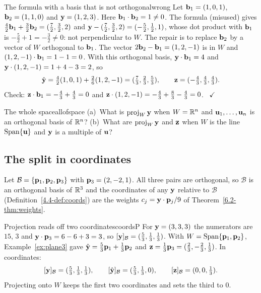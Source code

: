 \documentclass[11pt]{article}
\begin{document}
\begin{exmp}{The formula with a basis that is not orthogonal}{wrong}
Let $\mathbf{b}_1=(1,0,1)$, $\mathbf{b}_2=(1,1,0)$ and $\mathbf{y}=(1,2,3)$. Here $\mathbf{b}_1\cdot\mathbf{b}_2=1\neq0$. The formula (misused) gives $\tfrac42\mathbf{b}_1+\tfrac32\mathbf{b}_2=(\tfrac72,\tfrac32,2)$ and $\mathbf{y}-(\tfrac72,\tfrac32,2)=(-\tfrac52,\tfrac12,1)$, whose dot product with $\mathbf{b}_1$ is $-\tfrac52+1=-\tfrac32\neq0$: not perpendicular to $W$. The repair is to replace $\mathbf{b}_2$ by a vector of $W$ orthogonal to $\mathbf{b}_1$. The vector $2\mathbf{b}_2-\mathbf{b}_1=(1,2,-1)$ is in $W$ and $(1,2,-1)\cdot\mathbf{b}_1=1-1=0$. With this orthogonal basis, $\mathbf{y}\cdot\mathbf{b}_1=4$ and $\mathbf{y}\cdot(1,2,-1)=1+4-3=2$, so
\[
\hat{\mathbf{y}}=\tfrac42(1,0,1)+\tfrac26(1,2,-1)=(\tfrac73,\tfrac23,\tfrac53),\qquad\mathbf{z}=(-\tfrac43,\tfrac43,\tfrac43).
\]
Check: $\mathbf{z}\cdot\mathbf{b}_1=-\tfrac43+\tfrac43=0$ and $\mathbf{z}\cdot(1,2,-1)=-\tfrac43+\tfrac83-\tfrac43=0$. \ $\checkmark$
\end{exmp}

\begin{think}{The whole space}{allofspace}
(a)~What is $\operatorname{proj}_W\mathbf{y}$ when $W=\mathbb{R}^n$ and $\mathbf{u}_1,\dots,\mathbf{u}_n$ is an orthogonal basis of $\mathbb{R}^n$? (b)~What are $\operatorname{proj}_W\mathbf{y}$ and $\mathbf{z}$ when $W$ is the line $\operatorname{Span}\{\mathbf{u}\}$ and $\mathbf{y}$ is a multiple of $\mathbf{u}$?
\end{think}

\subsection*{The split in coordinates}

Let $\mathcal{B}=\{\mathbf{p}_1,\mathbf{p}_2,\mathbf{p}_3\}$ with $\mathbf{p}_3=(2,-2,1)$. All three pairs are orthogonal, so $\mathcal{B}$ is an orthogonal basis of $\mathbb{R}^3$ and the coordinates of any $\mathbf{y}$ relative to $\mathcal{B}$ (Definition~\ref{4.4-def:coords}) are the weights $c_j=\mathbf{y}\cdot\mathbf{p}_j/9$ of Theorem~\ref{6.2-thm:weights}.

\begin{exmp}{Projection reads off two coordinates}{coordsP}
For $\mathbf{y}=(3,3,3)$ the numerators are $15$, $3$ and $\mathbf{y}\cdot\mathbf{p}_3=6-6+3=3$, so $[\mathbf{y}]_{\mathcal{B}}=(\tfrac53,\tfrac13,\tfrac13)$. With $W=\operatorname{Span}\{\mathbf{p}_1,\mathbf{p}_2\}$, Example~\ref{ex:plane3} gave $\hat{\mathbf{y}}=\tfrac53\mathbf{p}_1+\tfrac13\mathbf{p}_2$ and $\mathbf{z}=\tfrac13\mathbf{p}_3=(\tfrac23,-\tfrac23,\tfrac13)$. In coordinates:
\[
[\mathbf{y}]_{\mathcal{B}}=(\tfrac53,\tfrac13,\tfrac13),\qquad[\hat{\mathbf{y}}]_{\mathcal{B}}=(\tfrac53,\tfrac13,0),\qquad[\mathbf{z}]_{\mathcal{B}}=(0,0,\tfrac13).
\]
Projecting onto $W$ keeps the first two coordinates and sets the third to $0$.
\end{exmp}
\end{document}
